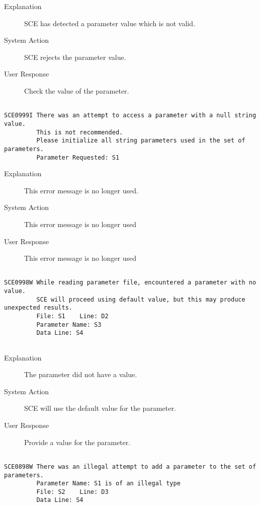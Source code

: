 \begin{description}
\item[Explanation]  SCE has detected a parameter value which is not valid. 

\item[System Action]  SCE rejects the parameter value.

\item[User Response]  Check the value of the parameter.
\end{description}
\hrulefill
\begin{verbatim}

SCE0999I There was an attempt to access a parameter with a null string value.
         This is not recommended.
         Please initialize all string parameters used in the set of parameters.
         Parameter Requested: S1
\end{verbatim}
\begin{description}
\item[Explanation]  This error message is no longer used.

\item[System Action]  This error message is no longer used

\item[User Response]  This error message is no longer used
\end{description}
\hrulefill
\begin{verbatim}

SCE0998W While reading parameter file, encountered a parameter with no value.
         SCE will proceed using default value, but this may produce unexpected results.
         File: S1    Line: D2
         Parameter Name: S3
         Data Line: S4
         
\end{verbatim}
\begin{description}
\item[Explanation]  The parameter did not have a value.

\item[System Action]  SCE will use the default value for the parameter.

\item[User Response]  Provide a value for the parameter.
\end{description}
\hrulefill
\begin{verbatim}

SCE0898W There was an illegal attempt to add a parameter to the set of parameters.
         Parameter Name: S1 is of an illegal type
         File: S2    Line: D3
         Data Line: S4
         
\end{verbatim}
